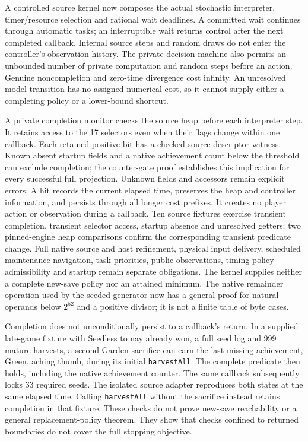 \documentclass[11pt,a4paper]{article}
\numberwithin{equation}{section}
\theoremstyle{definition}
\theoremstyle{remark}
\begin{document}
A controlled source kernel now composes the actual stochastic interpreter, timer/resource selection and rational wait deadlines. A committed wait continues through automatic tasks; an interruptible wait returns control after the next completed callback. Internal source steps and random draws do not enter the controller's observation history. The private decision machine also permits an unbounded number of private computation and random steps before an action. Genuine noncompletion and zero-time divergence cost infinity. An unresolved model transition has no assigned numerical cost, so it cannot supply either a completing policy or a lower-bound shortcut.

A private completion monitor checks the source heap before each interpreter step. It retains access to the 17 selectors even when their flags change within one callback. Each retained positive bit has a checked source-descriptor witness. Known absent startup fields and a native achievement count below the threshold can exclude completion; the counter-gate proof establishes this implication for every successful full projection. Unknown fields and accessors remain explicit errors. A hit records the current elapsed time, preserves the heap and controller information, and persists through all longer cost prefixes. It creates no player action or observation during a callback. Ten source fixtures exercise transient completion, transient selector access, startup absence and unresolved getters; two pinned-engine heap comparisons confirm the corresponding transient predicate change. Full native source and host refinement, physical input delivery, scheduled maintenance navigation, task priorities, public observations, timing-policy admissibility and startup remain separate obligations. The kernel supplies neither a complete new-save policy nor an attained minimum. The native remainder operation used by the seeded generator now has a general proof for natural operands below $2^{52}$ and a positive divisor; it is not a finite table of byte cases.

Completion does not unconditionally persist to a callback's return. In a supplied late-game fixture with Seedless to nay already won, a full seed log and 999 mature harvests, a second Garden sacrifice can earn the last missing achievement, Green, aching thumb, during its initial \texttt{harvestAll}. The complete predicate then holds, including the native achievement counter. The same callback subsequently locks 33 required seeds. The isolated source adapter reproduces both states at the same elapsed time. Calling \texttt{harvestAll} without the sacrifice instead retains completion in that fixture. These checks do not prove new-save reachability or a general replacement-policy theorem. They show that checks confined to returned boundaries do not cover the full stopping objective.
\end{document}
